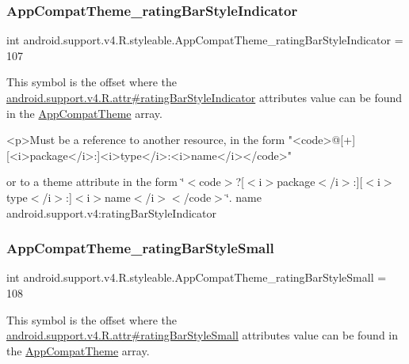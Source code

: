 \subsubsection{\texorpdfstring{App\+Compat\+Theme\+\_\+rating\+Bar\+Style\+Indicator}{AppCompatTheme\_ratingBarStyleIndicator}}
{\footnotesize\ttfamily int android.\+support.\+v4.\+R.\+styleable.\+App\+Compat\+Theme\+\_\+rating\+Bar\+Style\+Indicator = 107\hspace{0.3cm}{\ttfamily [static]}}

This symbol is the offset where the \hyperlink{classandroid_1_1support_1_1v4_1_1R_1_1attr_a0c3270465c677567d768450904e74941}{android.\+support.\+v4.\+R.\+attr\#rating\+Bar\+Style\+Indicator} attribute\textquotesingle{}s value can be found in the \hyperlink{classandroid_1_1support_1_1v4_1_1R_1_1styleable_ac07ebbe62ed977f6dcaadc6397840ace}{App\+Compat\+Theme} array.

\begin{DoxyVerb}      <p>Must be a reference to another resource, in the form "<code>@[+][<i>package</i>:]<i>type</i>:<i>name</i></code>"
\end{DoxyVerb}
 or to a theme attribute in the form \char`\"{}$<$code$>$?\mbox{[}$<$i$>$package$<$/i$>$\+:\mbox{]}\mbox{[}$<$i$>$type$<$/i$>$\+:\mbox{]}$<$i$>$name$<$/i$>$$<$/code$>$\char`\"{}.  name android.\+support.\+v4\+:rating\+Bar\+Style\+Indicator \mbox{\label{classandroid_1_1support_1_1v4_1_1R_1_1styleable_a82003426a43aa180e41d2b25450047c9}} 
\subsubsection{\texorpdfstring{App\+Compat\+Theme\+\_\+rating\+Bar\+Style\+Small}{AppCompatTheme\_ratingBarStyleSmall}}
{\footnotesize\ttfamily int android.\+support.\+v4.\+R.\+styleable.\+App\+Compat\+Theme\+\_\+rating\+Bar\+Style\+Small = 108\hspace{0.3cm}{\ttfamily [static]}}

This symbol is the offset where the \hyperlink{classandroid_1_1support_1_1v4_1_1R_1_1attr_a63f905da09e3e302af85eef728eceab0}{android.\+support.\+v4.\+R.\+attr\#rating\+Bar\+Style\+Small} attribute\textquotesingle{}s value can be found in the \hyperlink{classandroid_1_1support_1_1v4_1_1R_1_1styleable_ac07ebbe62ed977f6dcaadc6397840ace}{App\+Compat\+Theme} array.

